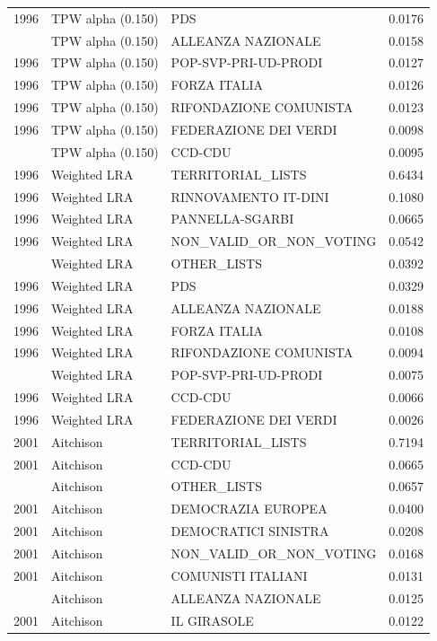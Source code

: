 \begin{longtable}[t]{rllr}
1996 & TPW alpha (0.150) & PDS & 0.0176\\
\addlinespace
1996 & TPW alpha (0.150) & ALLEANZA NAZIONALE & 0.0158\\
1996 & TPW alpha (0.150) & POP-SVP-PRI-UD-PRODI & 0.0127\\
1996 & TPW alpha (0.150) & FORZA ITALIA & 0.0126\\
1996 & TPW alpha (0.150) & RIFONDAZIONE COMUNISTA & 0.0123\\
1996 & TPW alpha (0.150) & FEDERAZIONE DEI VERDI & 0.0098\\
\addlinespace
1996 & TPW alpha (0.150) & CCD-CDU & 0.0095\\
1996 & Weighted LRA & TERRITORIAL\_LISTS & 0.6434\\
1996 & Weighted LRA & RINNOVAMENTO IT-DINI & 0.1080\\
1996 & Weighted LRA & PANNELLA-SGARBI & 0.0665\\
1996 & Weighted LRA & NON\_VALID\_OR\_NON\_VOTING & 0.0542\\
\addlinespace
1996 & Weighted LRA & OTHER\_LISTS & 0.0392\\
1996 & Weighted LRA & PDS & 0.0329\\
1996 & Weighted LRA & ALLEANZA NAZIONALE & 0.0188\\
1996 & Weighted LRA & FORZA ITALIA & 0.0108\\
1996 & Weighted LRA & RIFONDAZIONE COMUNISTA & 0.0094\\
\addlinespace
1996 & Weighted LRA & POP-SVP-PRI-UD-PRODI & 0.0075\\
1996 & Weighted LRA & CCD-CDU & 0.0066\\
1996 & Weighted LRA & FEDERAZIONE DEI VERDI & 0.0026\\
2001 & Aitchison & TERRITORIAL\_LISTS & 0.7194\\
2001 & Aitchison & CCD-CDU & 0.0665\\
\addlinespace
2001 & Aitchison & OTHER\_LISTS & 0.0657\\
2001 & Aitchison & DEMOCRAZIA EUROPEA & 0.0400\\
2001 & Aitchison & DEMOCRATICI SINISTRA & 0.0208\\
2001 & Aitchison & NON\_VALID\_OR\_NON\_VOTING & 0.0168\\
2001 & Aitchison & COMUNISTI ITALIANI & 0.0131\\
\addlinespace
2001 & Aitchison & ALLEANZA NAZIONALE & 0.0125\\
2001 & Aitchison & IL GIRASOLE & 0.0122\\

\end{longtable}
